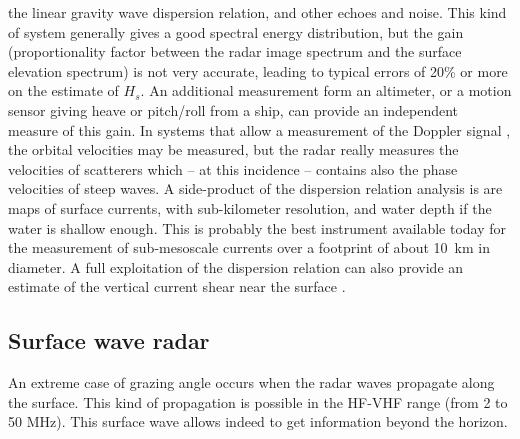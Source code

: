 the linear gravity wave dispersion relation, and other echoes and noise. This kind of system generally
gives a good spectral energy distribution, but the gain (proportionality factor between the radar image spectrum 
and the surface elevation spectrum) is not very accurate,  leading to typical errors of 20\% or more on the estimate of $H_s$. 
An additional measurement form an altimeter, or a motion sensor giving heave or pitch/roll from a ship, can provide an independent
measure of this gain. In systems that allow a measurement of the Doppler signal \citep[e.g.][]{Farquharson&al.2005}, the orbital velocities may be measured, but the radar really 
measures the velocities of scatterers which -- at this incidence -- contains also the phase velocities of steep waves.
A side-product of the dispersion relation analysis is are maps of surface currents, with sub-kilometer resolution, and water depth if the water is shallow enough.  This is probably the best instrument available today  for the measurement of sub-mesoscale currents over a footprint of about 10~km in diameter. A full exploitation of the dispersion relation can also provide an estimate of the vertical current shear near the surface \citep{Lund&al.2015}. 

\subsection{Surface wave radar}
An extreme case of grazing angle occurs when the radar waves propagate along the surface. This kind of propagation is possible
in the HF-VHF range (from 2 to 50 MHz). This surface wave allows indeed to get information beyond the horizon. 


